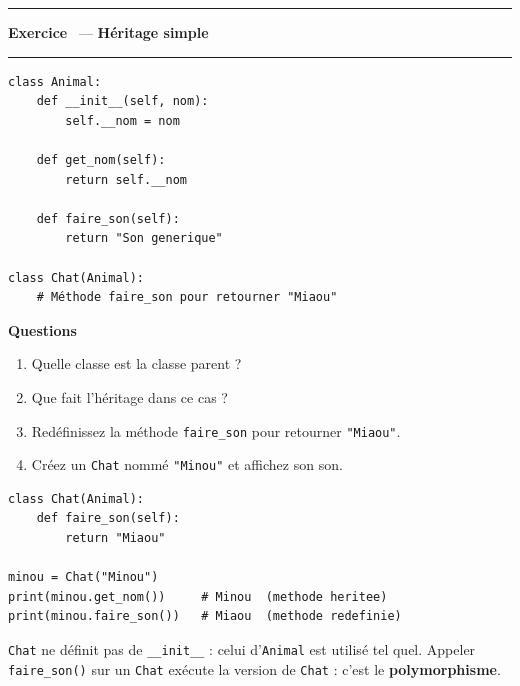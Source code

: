 \documentclass[10pt,a4paper]{article}
\newif\ifcorrige
\newcommand{\py}[1]{\texttt{#1}}
\newcounter{exo}
\newcommand{\exo}[1]{%
  \stepcounter{exo}\par\vspace{4pt}
  \ifcorrige\else\noindent\minipage{\textwidth}\fi
  \noindent\textcolor{qbar}{\rule{2.5pt}{10pt}}\hspace{4pt}%
  \textbf{\color{qbar}Exercice \theexo}\ --- \textbf{#1}%
  \par\nobreak\vspace{-3pt}\noindent\textcolor{qbar!35}{\rule{\textwidth}{0.6pt}}%
  \par\nobreak\vspace{1pt}}
\newenvironment{codebloc}
  {\ifcorrige\else\noindent\minipage[t]{0.50\textwidth}\vspace{0pt}\fi}
  {\ifcorrige\else\endminipage\hfill\fi}
\newenvironment{qbloc}
  {\ifcorrige\else\minipage[t]{0.475\textwidth}\vspace{0pt}\fi
   \textbf{\small Questions}\begin{enumerate}[leftmargin=*,nosep,label=\arabic*.]}
  {\end{enumerate}\ifcorrige\else\endminipage\par\fi}
\newcommand{\rep}[1]{\ifcorrige\par\smallskip{\color{corr}\small#1}\par\smallskip\fi}
\newlength{\zoneadj}\setlength{\zoneadj}{0pt}
\newcommand{\zone}[1][4cm]{%
  \ifcorrige\else
    \par\vspace{2pt}\noindent
    \begin{tcolorbox}[colback=white,colframe=black!45,boxrule=0.5pt,arc=1pt,height={\dimexpr#1-\zoneadj\relax},
      left=4pt,right=4pt,top=2pt,bottom=2pt,
      title={\scriptsize\itshape Réponses},coltitle=black!55,fonttitle=\itshape,
      detach title,before upper={\tcbtitle\par}]\end{tcolorbox}%
    \endminipage\par
  \fi}
\newenvironment{solution}
  {\ifcorrige
     \begin{tcolorbox}[enhanced,breakable,colback=corrbg,colframe=corr,boxrule=0.6pt,arc=1pt,
       left=5pt,right=5pt,top=3pt,bottom=3pt,fontupper=\small,
       title={Corrigé},coltitle=corr,fonttitle=\bfseries\small,detach title,
       before upper={\tcbtitle\par\smallskip}]%
   \else
     \setbox0\vbox\bgroup
   \fi}
  {\ifcorrige\end{tcolorbox}\else\egroup\fi}
\begin{document}
\exo{Héritage simple}
\begin{codebloc}
\begin{lstlisting}
class Animal:
    def __init__(self, nom):
        self.__nom = nom

    def get_nom(self):
        return self.__nom

    def faire_son(self):
        return "Son generique"

class Chat(Animal):
    # Méthode faire_son pour retourner "Miaou"
\end{lstlisting}
\end{codebloc}
\begin{qbloc}
  \item Quelle classe est la classe parent ?
    \rep{\py{Animal}. \py{Chat} est la classe fille (ou classe dérivée).}
  \item Que fait l'héritage dans ce cas ?
    \rep{\py{Chat} récupère sans les réécrire le constructeur \py{__init__}, l'attribut privé
    \py{__nom} et la méthode \py{get_nom} d'\py{Animal}. Elle peut en plus redéfinir \py{faire_son}
    pour lui donner son comportement propre.}
  \item Redéfinissez la méthode \py{faire_son} pour retourner \py{"Miaou"}.
  \item Créez un \py{Chat} nommé \py{"Minou"} et affichez son son.
\end{qbloc}
\zone[4.0cm]
\begin{solution}
\begin{lstlisting}
class Chat(Animal):
    def faire_son(self):
        return "Miaou"

minou = Chat("Minou")
print(minou.get_nom())     # Minou  (methode heritee)
print(minou.faire_son())   # Miaou  (methode redefinie)
\end{lstlisting}
\py{Chat} ne définit pas de \py{__init__} : celui d'\py{Animal} est utilisé tel quel. Appeler
\py{faire_son()} sur un \py{Chat} exécute la version de \py{Chat} : c'est le
\textbf{polymorphisme}.
\end{solution}
\end{document}
